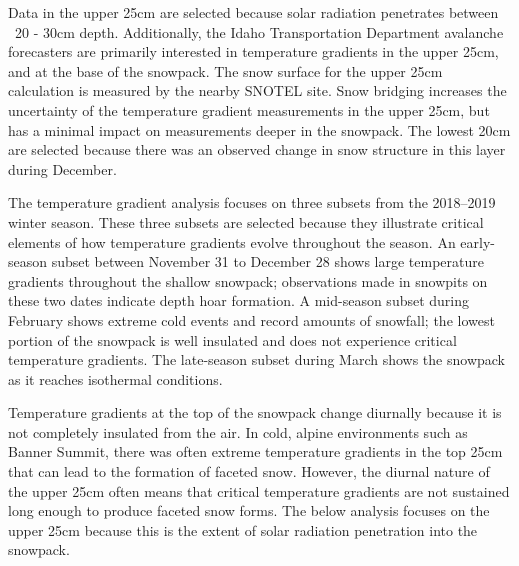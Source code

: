 Data in the upper 25cm are selected because solar radiation penetrates between ~20 - 30cm depth. Additionally, the Idaho Transportation Department avalanche forecasters are primarily interested in temperature gradients in the upper 25cm, and at the base of the snowpack. The snow surface for the upper 25cm calculation is measured by the nearby SNOTEL site. Snow bridging increases the uncertainty of the temperature gradient measurements in the upper 25cm, but has a minimal impact on measurements deeper in the snowpack. The lowest 20cm are selected because there was an observed change in snow structure in this layer during December.

The temperature gradient analysis focuses on three subsets from the 2018--2019 winter season. These three subsets are selected because they illustrate critical elements of how temperature gradients evolve throughout the season. An early-season subset between November 31 to December 28 shows large temperature gradients throughout the shallow snowpack; observations made in snowpits on these two dates indicate depth hoar formation. A mid-season subset during February shows extreme cold events and record amounts of snowfall; the lowest portion of the snowpack is well insulated and does not experience critical temperature gradients. The late-season subset during March shows the snowpack as it reaches isothermal conditions.  

Temperature gradients at the top of the snowpack change diurnally because it is not completely insulated from the air. In cold, alpine environments such as Banner Summit, there was often extreme temperature gradients in the top 25cm that can lead to the formation of faceted snow. However, the diurnal nature of the upper 25cm often means that critical temperature gradients are not sustained long enough to produce faceted snow forms. The below analysis focuses on the upper 25cm because this is the extent of solar radiation penetration into the snowpack.  

